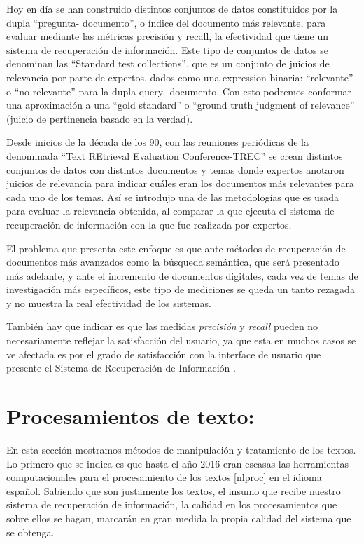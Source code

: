 \documentclass[
  10,
  openany]{book}
\begin{document}
Hoy en día se han construido distintos conjuntos de datos constituidos por la dupla ``pregunta- documento'', o índice del documento más relevante, para evaluar mediante las métricas precisión y recall, la efectividad que tiene un sistema de recuperación de información. Este tipo de conjuntos de datos se denominan las ``Standard test collections'', que es un conjunto de juicios de relevancia por parte de expertos, dados como una expression binaria: ``relevante'' o ``no relevante'' para la dupla query- documento. Con esto podremos conformar una aproximación a una ``gold standard'' o ``ground truth judgment of relevance'' (juicio de pertinencia basado en la verdad).

Desde inicios de la década de los 90, con las reuniones periódicas de la denominada ``Text REtrieval Evaluation Conference-TREC'' se crean distintos conjuntos de datos con distintos documentos y temas donde expertos anotaron juicios de relevancia para indicar cuáles eran los documentos más relevantes para cada uno de los temas. Así se introdujo una de las metodologías que es usada para evaluar la relevancia obtenida, al comparar la que ejecuta el sistema de recuperación de información con la que fue realizada por expertos.

El problema que presenta este enfoque es que ante métodos de recuperación de documentos más avanzados como la búsqueda semántica, que será presentado más adelante, y ante el incremento de documentos digitales, cada vez de temas de investigación más específicos, este tipo de mediciones se queda un tanto rezagada y no muestra la real efectividad de los sistemas.

También hay que indicar es que las medidas \emph{precisión} y \emph{recall} pueden no necesariamente reflejar la satisfacción del usuario, ya que esta en muchos casos se ve afectada es por el grado de satisfacción con la interface de usuario que presente el Sistema de Recuperación de Información \citep{manning2008}.

\hypertarget{PT}{%
\section{Procesamientos de texto:}\label{PT}}

En esta sección mostramos métodos de manipulación y tratamiento de los textos. Lo primero que se indica es que hasta el año 2016 eran escasas las herramientas computacionales para el procesamiento de los textos \ref{nlproc} en el idioma español. Sabiendo que son justamente los textos, el insumo que recibe nuestro sistema de recuperación de información, la calidad en los procesamientos que sobre ellos se hagan, marcarán en gran medida la propia calidad del sistema que se obtenga.
\end{document}
